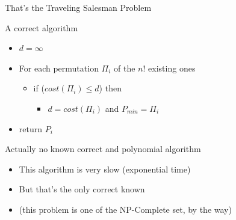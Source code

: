 \begin{frame}{That's the Traveling Salesman Problem}
  \begin{block}{A correct algorithm}
    \begin{itemize}
    \item $d=\infty$
    \item For each permutation $\Pi_i$ of the $n!$ existing ones
      \begin{itemize}
      \item if ($cost(\Pi_i)\leq d$) then
        \begin{itemize}
        \item $d=cost(\Pi_i)$ and $P_{min}=\Pi_i$
        \end{itemize}
      \end{itemize}
    \item return $P_i$
    \end{itemize}
  \end{block}

  \begin{block}{Actually no known correct and polynomial algorithm}
    \begin{itemize}
    \item This algorithm is very slow (exponential time)
    \item But that's the only correct known
    \item (this problem is one of the NP-Complete set, by the way)
    \end{itemize}
  \end{block}

  \bigskip
\end{frame}
